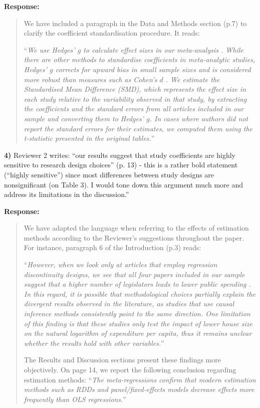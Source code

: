 \documentclass[a4paper,12pt]{article}
\begin{document}
\noindent \textbf{Response:} 
\begin{quote}
    We have included a paragraph in the Data and Methods section (p.7) to clarify the coefficient standardisation procedure. It reads:
    
    ``\textit{We use Hedges' $g$ to calculate effect sizes in our meta-analysis \citep{hedges1981distribution}. While there are other methods to standardise coefficients in meta-analytic studies, Hedges' $g$ corrects for upward bias in small sample sizes and is considered more robust than measures such as Cohen's $d$ \citep{lakens2013calculating}. We estimate the Standardised Mean Difference (SMD), which represents the effect size in each study relative to the variability observed in that study, by extracting the coefficients and the standard errors from all articles included in our sample and converting them to Hedges' $g$. In cases where authors did not report the standard errors for their estimates, we computed them using the t-statistic presented in the original tables.}''
\end{quote}

\vspace{.3cm}

\noindent \textbf{4)} Reviewer 2 writes: ``our results suggest that study coefficients are highly sensitive to research design choices'' (p. 13) - this is a rather bold statement (``highly sensitive'') since most differences between study designs are nonsignificant (on Table 3). I would tone down this argument much more and address its limitations in the discussion.'' 

\vspace{.3cm}

\noindent \textbf{Response:} 
\begin{quote}
    We have adapted the language when referring to the effects of estimation methods according to the Reviewer's suggestions throughout the paper. For instance, paragraph 6 of the Introduction (p.3) reads:
    
    ``\textit{However, when we look only at articles that employ regression discontinuity designs, we see that all four papers included in our sample suggest that a higher number of legislators leads to lower public spending \citep{debenedetto2018effect, hohmann2017effect, lewis2019legislature, petterssonlidbom2012size}. In this regard, it is possible that methodological choices partially explain the divergent results observed in the literature, as studies that use causal inference methods consistently point to the same direction. One limitation of this finding is that these studies only test the impact of lower house size on the natural logarithm of expenditure per capita, thus it remains unclear whether the results hold with other variables.}''
    
    The Results and Discussion sections present these findings more objectively. On page 14, we report the following conclusion regarding estimation methods: ``\textit{The meta-regressions confirm that modern estimation methods such as RDDs and panel/fixed-effects models decrease effects more frequently than OLS regressions.}''
\end{quote}
\end{document}
